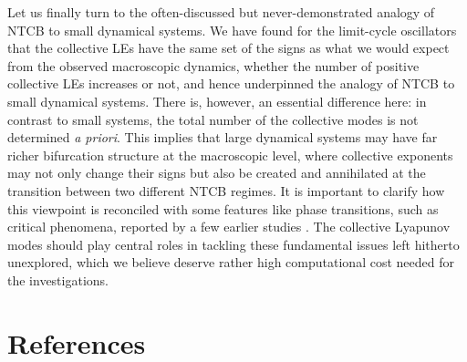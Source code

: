 \documentclass[12pt]{iopart}
\begin{document}
Let us finally turn to the often-discussed but never-demonstrated analogy
 of NTCB to small dynamical systems.
We have found for the limit-cycle oscillators that the collective LEs
 have the same set of the signs as what we would expect
 from the observed macroscopic dynamics,
 whether the number of positive collective LEs increases or not,
 and hence underpinned the analogy of NTCB to small dynamical systems.
There is, however, an essential difference here:
 in contrast to small systems,
 the total number of the collective modes is not determined \textit{a priori}.
This implies that large dynamical systems may have far richer
 bifurcation structure at the macroscopic level,
 where collective exponents may not only change their signs
 but also be created and annihilated
 at the transition between two different NTCB regimes.
It is important to clarify how this viewpoint is reconciled
 with some features like phase transitions, such as critical phenomena,
 reported by a few earlier studies
 \cite{Lemaitre.Chate-PRL1999,Marcq.etal-PTPS2006}.
The collective Lyapunov modes should play central roles
 in tackling these fundamental issues left hitherto unexplored,
 which we believe deserve rather high computational cost
 needed for the investigations.

\section*{References}


\end{document}
